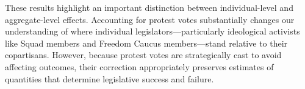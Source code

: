 \documentclass[11pt]{article}
\begin{document}
These results highlight an important distinction between individual-level and aggregate-level effects. Accounting for protest votes substantially changes our understanding of where individual legislators—particularly ideological activists like Squad members and Freedom Caucus members—stand relative to their copartisans. However, because protest votes are strategically cast to avoid affecting outcomes, their correction appropriately preserves estimates of quantities that determine legislative success and failure.
\end{document}
